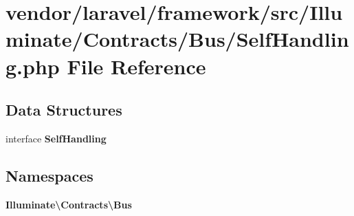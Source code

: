 \section{vendor/laravel/framework/src/\+Illuminate/\+Contracts/\+Bus/\+Self\+Handling.php File Reference}
\label{_self_handling_8php}
\subsection*{Data Structures}
\begin{DoxyCompactItemize}
\item 
interface {\bf Self\+Handling}
\end{DoxyCompactItemize}
\subsection*{Namespaces}
\begin{DoxyCompactItemize}
\item 
 {\bf Illuminate\textbackslash{}\+Contracts\textbackslash{}\+Bus}
\end{DoxyCompactItemize}
